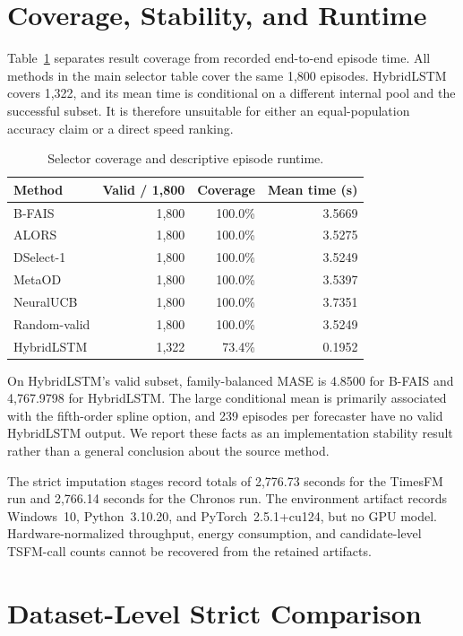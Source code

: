 \section{Coverage, Stability, and Runtime}
\label{app:coverage}

Table~\ref{tab:runtime-coverage} separates result coverage from recorded end-to-end episode time. All methods in the main selector table cover the same 1,800 episodes. HybridLSTM covers 1,322, and its mean time is conditional on a different internal pool and the successful subset. It is therefore unsuitable for either an equal-population accuracy claim or a direct speed ranking.

\begin{table}[h]
\centering
\small
\caption{Selector coverage and descriptive episode runtime.}
\label{tab:runtime-coverage}
\begin{tabular}{lrrr}
\toprule
Method & Valid / 1,800 & Coverage & Mean time (s) \\
\midrule
B-FAIS & 1,800 & 100.0\% & 3.5669 \\
ALORS & 1,800 & 100.0\% & 3.5275 \\
DSelect-1 & 1,800 & 100.0\% & 3.5249 \\
MetaOD & 1,800 & 100.0\% & 3.5397 \\
NeuralUCB & 1,800 & 100.0\% & 3.7351 \\
Random-valid & 1,800 & 100.0\% & 3.5249 \\
HybridLSTM & 1,322 & 73.4\% & 0.1952 \\
\bottomrule
\end{tabular}
\end{table}

On HybridLSTM's valid subset, family-balanced MASE is 4.8500 for B-FAIS and 4,767.9798 for HybridLSTM. The large conditional mean is primarily associated with the fifth-order spline option, and 239 episodes per forecaster have no valid HybridLSTM output. We report these facts as an implementation stability result rather than a general conclusion about the source method.

The strict imputation stages record totals of 2,776.73 seconds for the TimesFM run and 2,766.14 seconds for the Chronos run. The environment artifact records Windows~10, Python~3.10.20, and PyTorch~2.5.1+cu124, but no GPU model. Hardware-normalized throughput, energy consumption, and candidate-level TSFM-call counts cannot be recovered from the retained artifacts.

\section{Dataset-Level Strict Comparison}
\label{app:strict-results}

